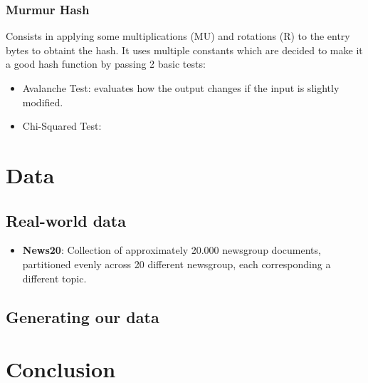 \documentclass[12pt]{article}
\begin{document}
\subsubsection{Murmur Hash}

Consists in applying some multiplications (MU) and rotations (R) to the entry bytes to obtaint the hash. It uses multiple constants which are decided to make it a good hash function by passing 2 basic tests: 

\begin{itemize}
\item Avalanche Test: evaluates how the output changes if the input is slightly modified.  
\item Chi-Squared Test: 
\end{itemize}

\section{Data} %

\subsection{Real-world data}
\begin{itemize}
\item \textbf{News20}: Collection of approximately 20.000 newsgroup documents, partitioned evenly across 20 different newsgroup, each corresponding a different topic. 
\end{itemize}

\subsection{Generating our data}


\section{Conclusion}


\newpage
\end{document}
